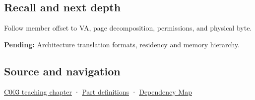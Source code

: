 \subsection{Recall and next depth}\label{appendix-18ee4f913c3c-recall-and-next-depth}

Follow member offset to VA, page decomposition, permissions, and physical byte.

\textbf{Pending:} Architecture translation formats, residency and memory hierarchy.

\subsection{Source and navigation}\label{appendix-18ee4f913c3c-source-and-navigation}

\hyperref[01-foundations-i-ch002-where-the-bytes-live]{C003 teaching chapter} · \hyperref[appendix-fd090d982a15-m003---parts-41-60]{Part definitions} · \hyperref[appendix-4ad47bdd269a]{Dependency Map}
